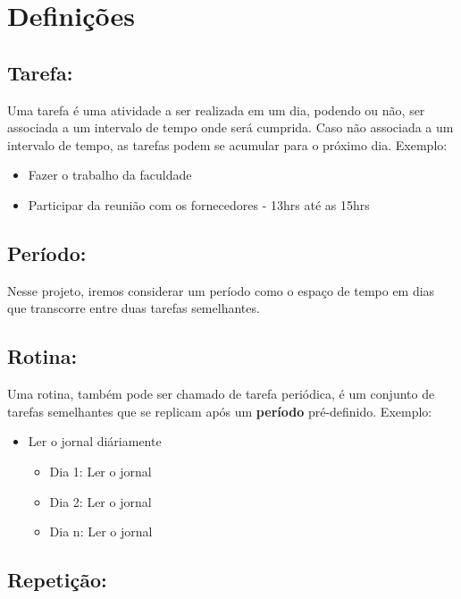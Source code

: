 \chapter{Definições}

\section{Tarefa:}

Uma tarefa é uma atividade a ser realizada em um dia, podendo ou não, ser
associada a um intervalo de tempo onde será cumprida. Caso não associada a um
intervalo de tempo, as tarefas podem se acumular para o próximo dia. Exemplo:

\begin{itemize}
  \item{Fazer o trabalho da faculdade}
  \item{Participar da reunião com os fornecedores - 13hrs até as 15hrs}
\end{itemize}


\section{Período:}

Nesse projeto, iremos considerar um período como o espaço de tempo em dias que
transcorre entre duas tarefas semelhantes.

\section{Rotina:}

Uma rotina, também pode ser chamado de tarefa periódica, é um conjunto de tarefas
semelhantes que se replicam após um \textbf{período} pré-definido. Exemplo:

\begin{itemize}
  \item{Ler o jornal diáriamente}
  \begin{itemize}
    \item{Dia 1: Ler o jornal}
    \item{Dia 2: Ler o jornal}
    \item{Dia n: Ler o jornal}
  \end{itemize}
\end{itemize}

\section{Repetição:}

